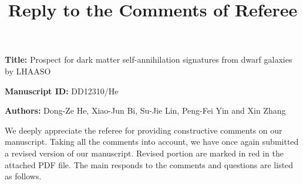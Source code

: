 \documentclass{article}
\begin{document}
\title{Reply to the Comments of Referee} \maketitle \date{}

\begin{flushleft}
\textbf{Title:} Prospect for dark matter self-annihilation signatures from dwarf galaxies by LHAASO

\textbf{Manuscript ID:} DD12310/He

\textbf{Authors:} Dong-Ze He, Xiao-Jun Bi, Su-Jie Lin, Peng-Fei Yin and Xin Zhang
\end{flushleft}
\vspace{3mm}




We deeply appreciate the referee for providing constructive comments on our manuscript.
Taking all the comments into account, we have once again submitted a revised version of our manuscript. Revised portion are marked in red in the attached PDF file. The main responds to the comments and questions are listed as follows.
\end{document}
